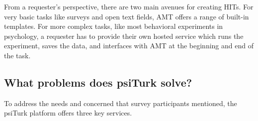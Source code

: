 \documentclass[twocolumn]{svjour3}          %
\begin{document}
From a requester's perspective, there are two main avenues for creating HITs. For very basic tasks like surveys
and open text fields, AMT offers a range of built-in templates. For more complex tasks, like most behavioral
experiments in psychology,  a requester has to provide their own hosted service which runs the experiment, saves the data, 
and interfaces with AMT at the beginning and end of the task.



\subsection{What problems does psiTurk solve?}
To address the needs and concerned that survey participants mentioned, the psiTurk platform
 offers three key services.
\end{document}

